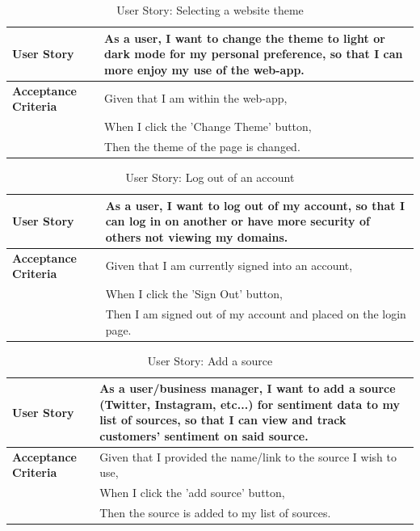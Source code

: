 \documentclass[12pt]{article}
\begin{document}
\begin{table}[htbp]
\caption{User Story: Selecting a website theme}
\begin{tabular}{|p{}|p{}|}
\hline
\textbf{User Story} & As a user, I want to change the theme to light or dark mode for my personal preference, so that I can more enjoy my use of the web-app. \\
\hline
\textbf{Acceptance Criteria} & 
Given that I am within the web-app,\\
& When I click the 'Change Theme' button,\\
& Then the theme of the page is changed. \\
\hline
\end{tabular}
\end{table}
\begin{table}[htbp]
\caption{User Story: Log out of an account}
\begin{tabular}{|p{}|p{}|}
\hline
\textbf{User Story} & As a user, I want to log out of my account, so that I can log in on another or have more security of others not viewing my domains. \\
\hline
\textbf{Acceptance Criteria} & 
Given that I am currently signed into an account,\\
& When I click the 'Sign Out' button,\\
& Then I am signed out of my account and placed on the login page. \\
\hline
\end{tabular}
\end{table}
\begin{table}[htbp]
\caption{User Story: Add a source}
\begin{tabular}{|p{}|p{}|}
\hline
\textbf{User Story} & As a user/business manager, I want to add a source (Twitter, Instagram, etc...) for sentiment data to my list of sources, so that I can view and track customers' sentiment on said source. \\
\hline
\textbf{Acceptance Criteria} & 
Given that I provided the name/link to the source I wish to use,\\
& When I click the 'add source' button,\\
& Then the source is added to my list of sources. \\
\hline
\end{tabular}
\end{table}
\end{document}

